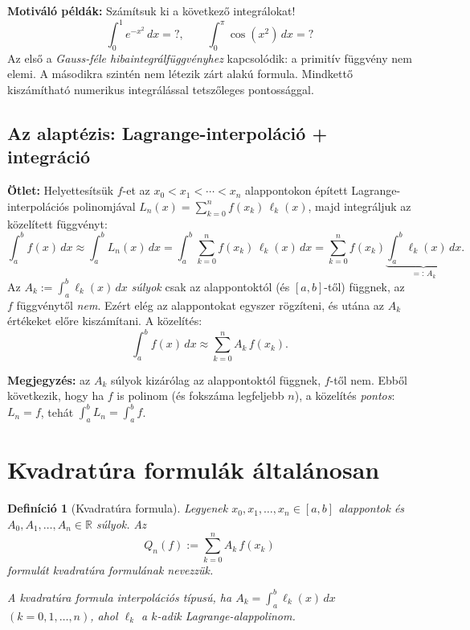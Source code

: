 \documentclass[a4paper,12pt]{article}
\theoremstyle{mydef}
\newtheorem{definicio}[tetel]{Definíció}
\newcommand{\R}{\mathbb{R}}
\begin{document}
\begin{mdframed}[backgroundcolor=exbg,linewidth=0pt,innertopmargin=6pt,innerbottommargin=6pt]
\textbf{Motiváló példák:} Számítsuk ki a következő integrálokat!
\[
  \int_0^1 e^{-x^2}\,dx = ?,\qquad \int_0^\pi \cos(x^2)\,dx = ?
\]
Az első a \emph{Gauss-féle hibaintegrálfüggvényhez} kapcsolódik: a primitív függvény nem
elemi. A másodikra szintén nem létezik zárt alakú formula. Mindkettő kiszámítható
numerikus integrálással tetszőleges pontossággal.
\end{mdframed}

\subsection*{Az alaptézis: Lagrange-interpoláció + integráció}

\textbf{Ötlet:} Helyettesítsük $f$-et az $x_0 < x_1 < \cdots < x_n$ alappontokon
épített Lagrange-interpolációs polinomjával $L_n(x) = \sum_{k=0}^n f(x_k)\,\ell_k(x)$,
majd integráljuk az közelített függvényt:
\[
  \int_a^b f(x)\,dx \approx \int_a^b L_n(x)\,dx
  = \int_a^b \sum_{k=0}^n f(x_k)\,\ell_k(x)\,dx
  = \sum_{k=0}^n f(x_k) \underbrace{\int_a^b \ell_k(x)\,dx}_{=:\,A_k}.
\]
Az $A_k := \int_a^b \ell_k(x)\,dx$ \emph{súlyok} csak az alappontoktól (és $[a,b]$-től)
függnek, az $f$ függvénytől \emph{nem}. Ezért elég az alappontokat egyszer rögzíteni,
és utána az $A_k$ értékeket előre kiszámítani. A közelítés:
\[
  \boxed{\int_a^b f(x)\,dx \approx \sum_{k=0}^n A_k\,f(x_k).}
\]

\textbf{Megjegyzés:} az $A_k$ súlyok kizárólag az alappontoktól függnek, $f$-től nem.
Ebből következik, hogy ha $f$ is polinom (és fokszáma legfeljebb $n$), a közelítés
\emph{pontos}: $L_n = f$, tehát $\int_a^b L_n = \int_a^b f$.

\section{Kvadratúra formulák általánosan}
\label{sec:kvadratura}

\begin{mdframed}[backgroundcolor=defbg,linewidth=0pt,innertopmargin=8pt,innerbottommargin=8pt]
\begin{definicio}[Kvadratúra formula]
Legyenek $x_0, x_1, \ldots, x_n \in [a,b]$ \emph{alappontok} és $A_0, A_1, \ldots, A_n \in \R$
\emph{súlyok}. Az
\[
  Q_n(f) := \sum_{k=0}^n A_k\,f(x_k)
\]
formulát \emph{kvadratúra formulának} nevezzük.

A kvadratúra formula \emph{interpolációs típusú}, ha $A_k = \int_a^b \ell_k(x)\,dx$
$(k = 0, 1, \ldots, n)$, ahol $\ell_k$ a $k$-adik Lagrange-alappolinom.
\end{definicio}
\end{mdframed}
\end{document}
